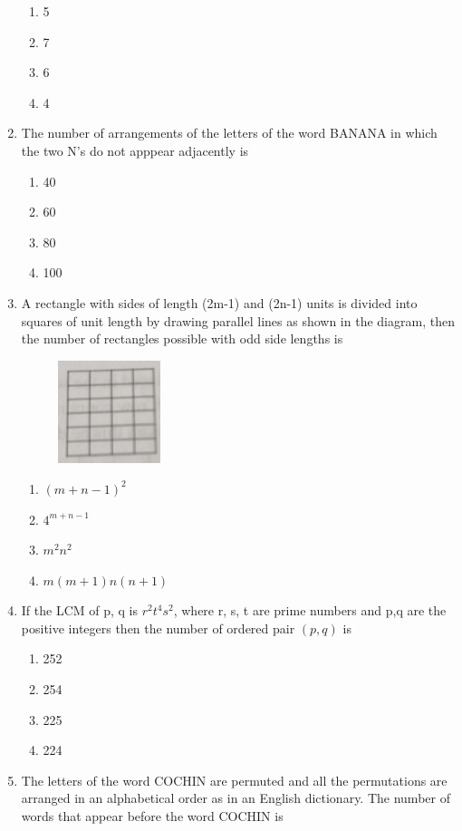 \documentclass[journal,12pt,twocolumn]{IEEEtran}
\begin{document}
\begin{enumerate}
\begin{enumerate}
\item 5
\item 7
\item 6
\item 4\\
\end{enumerate}
\item The number of arrangements of the letters of the word BANANA in which the two N's do not apppear adjacently is
\begin{enumerate}
\item 40
\item 60
\item 80
\item 100\\
\end{enumerate}
\item A rectangle with sides of length (2m-1) and (2n-1) units is divided into squares of unit length by drawing parallel lines as shown in the diagram, then the number of rectangles possible with odd side lengths is
\begin{figure}
	\includegraphics[width=30mm,scale=0.5]{./Figs/a.eps} 
\end{figure}
\begin{enumerate}
\item $(m+n-1)^2$
\item $4^{m+n-1}$
\item $m^2n^2$
\item $m(m+1)n(n+1)$\\
\end{enumerate}
\item If the LCM of p, q is $r^2t^4s^2$, where r, s, t are prime numbers and p,q are the positive integers then the number of ordered pair $(p,q)$ is
\begin{enumerate}
\item 252
\item 254
\item 225
\item 224\\
\end{enumerate}
\item The letters of the word COCHIN are permuted and all the permutations are arranged in an alphabetical order as in an English dictionary. The number of words that appear before the word COCHIN is 

\end{enumerate}
\end{document}
